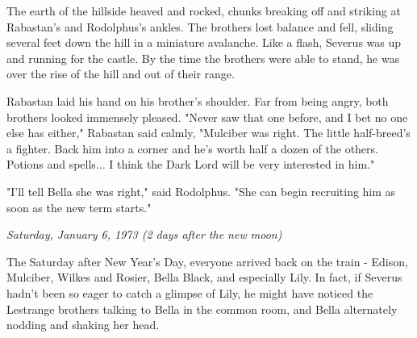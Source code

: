 \documentclass[a4paper,11pt]{article}
\begin{document}
The earth of the hillside heaved and rocked, chunks breaking off and striking at Rabastan's and Rodolphus's ankles. The brothers lost balance and fell, sliding several feet down the hill in a miniature avalanche. Like a flash, Severus was up and running for the castle. By the time the brothers were able to stand, he was over the rise of the hill and out of their range.

Rabastan laid his hand on his brother's shoulder. Far from being angry, both brothers looked immensely pleased. "Never saw that one before, and I bet no one else has either," Rabastan said calmly, "Mulciber was right. The little half-breed's a fighter. Back him into a corner and he's worth half a dozen of the others. Potions and spells... I think the Dark Lord will be very interested in him."

"I'll tell Bella she was right," said Rodolphus. "She can begin recruiting him as soon as the new term starts."

\emph{Saturday, January 6, 1973 (2 days after the new moon)}

The Saturday after New Year's Day, everyone arrived back on the train - Edison, Mulciber, Wilkes and Rosier, Bella Black, and especially Lily. In fact, if Severus hadn't been so eager to catch a glimpse of Lily, he might have noticed the Lestrange brothers talking to Bella in the common room, and Bella alternately nodding and shaking her head.
\end{document}
